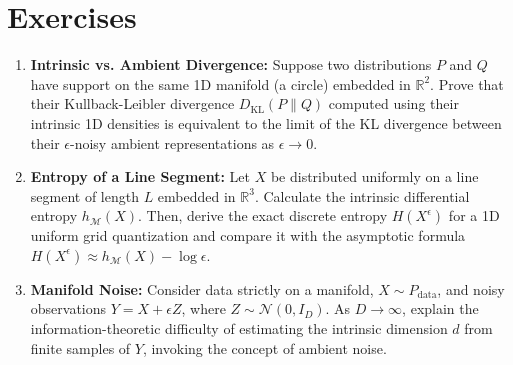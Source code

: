 \section*{Exercises}
\begin{enumerate}
    \item \textbf{Intrinsic vs. Ambient Divergence:} Suppose two distributions $P$ and $Q$ have support on the same 1D manifold (a circle) embedded in $\mathbb{R}^2$. Prove that their Kullback-Leibler divergence $D_{\text{KL}}(P \parallel Q)$ computed using their intrinsic 1D densities is equivalent to the limit of the KL divergence between their $\epsilon$-noisy ambient representations as $\epsilon \to 0$.
    \item \textbf{Entropy of a Line Segment:} Let $X$ be distributed uniformly on a line segment of length $L$ embedded in $\mathbb{R}^3$. Calculate the intrinsic differential entropy $h_{\mathcal{M}}(X)$. Then, derive the exact discrete entropy $H(X^\epsilon)$ for a 1D uniform grid quantization and compare it with the asymptotic formula $H(X^\epsilon) \approx h_{\mathcal{M}}(X) - \log \epsilon$.
    \item \textbf{Manifold Noise:} Consider data strictly on a manifold, $X \sim P_{\text{data}}$, and noisy observations $Y = X + \epsilon Z$, where $Z \sim \mathcal{N}(0, I_{D})$. As $D \to \infty$, explain the information-theoretic difficulty of estimating the intrinsic dimension $d$ from finite samples of $Y$, invoking the concept of ambient noise.
\end{enumerate}

